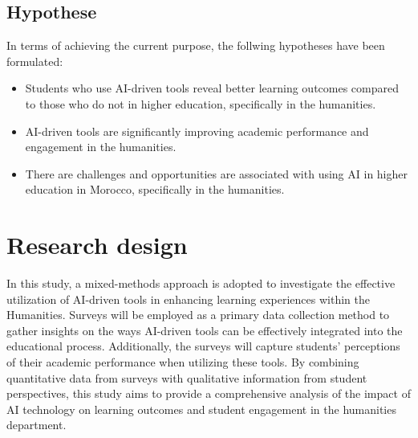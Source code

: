 \subsection{Hypothese}
In terms of achieving the current purpose, the follwing hypotheses have been formulated:
\begin{itemize}
	\item Students who use AI-driven tools reveal better learning outcomes
	      compared to those who do not in higher education, specifically in the humanities.
	\item AI-driven tools are significantly improving academic
	      performance and engagement in the humanities.
	\item There are challenges and opportunities are associated with using AI in higher
	      education in Morocco, specifically in the humanities.
\end{itemize}

\section{Research design}
In this study, a mixed-methods approach is adopted to investigate the effective utilization
of AI-driven tools in enhancing learning experiences within the Humanities. Surveys will
be employed as a primary data collection method to gather insights on the ways AI-driven
tools can be effectively integrated into the educational process. Additionally, the surveys
will capture students' perceptions of their academic performance when utilizing these tools.
By combining quantitative data from surveys with qualitative information from student perspectives,
this study aims to provide a comprehensive analysis of the impact of AI technology on learning outcomes
and student engagement in the humanities department.

